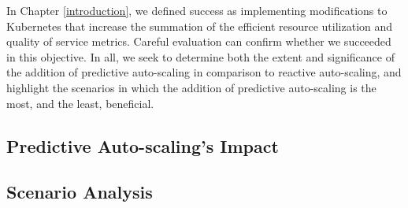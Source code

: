 In Chapter \ref{introduction}, we defined success as implementing
modifications to Kubernetes that increase the summation of the
efficient resource utilization and quality of service metrics. Careful
evaluation can confirm whether we succeeded in this objective. In all, we
seek to determine both the extent and significance of the addition of predictive
auto-scaling in comparison to reactive auto-scaling,
and highlight the scenarios in which the addition
of predictive auto-scaling is the most, and the least, beneficial.

\subsection{Predictive Auto-scaling's Impact}



\subsection{Scenario Analysis}



